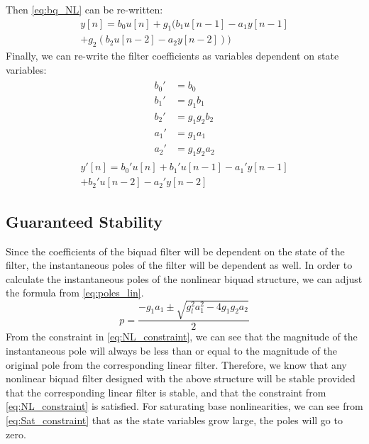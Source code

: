 \documentclass[twoside,a4paper]{article}
\begin{document}
%
Then \cref{eq:bq_NL} can be re-written:
%
\begin{equation}
\begin{split}
    y[n] = b_0 u[n]
         + g_1 (b_1 u[n-1] - a_1 y[n-1] \\
         + g_2 (b_2 u[n-2] - a_2 y[n-2]))
\end{split}
    \label{eq:bq_re-write}
\end{equation}
%
Finally, we can re-write the filter coefficients as variables dependent on
state variables:
%
\begin{align}
\begin{split}
    b_0' &= b_0\\
    b_1' &= g_1 b_1\\
    b_2' &= g_1 g_2 b_2\\
    a_1' &= g_1 a_1\\
    a_2' &= g_1 g_2 a_2
\end{split}
    \label{eq:bq_coefs_re-write}
\end{align}
%
\begin{equation}
\begin{split}
    y'[n] = b_0' u[n]
    + b_1' u[n-1] - a_1' y[n-1] \\
    + b_2' u[n-2] - a_2' y[n-2]
\end{split}
    \label{eq:bq_re-write2}
\end{equation}
%

\subsection{Guaranteed Stability}
%
Since the coefficients of the biquad filter will be dependent on the
state of the filter, the instantaneous poles of the filter will be
dependent as well. In order to calculate the instantaneous poles of
the nonlinear biquad structure, we can adjust the formula from
\cref{eq:poles_lin}.
%
\begin{equation}
    p = \frac{-g_1 a_1 \pm \sqrt{g_l^2 a_1^2- 4 g_1 g_2 a_2}}{2}
    \label{eq:poles_nl}
\end{equation}
%
From the constraint in \cref{eq:NL_constraint}, we can see that the
magnitude of the instantaneous pole will always be less than or equal to
the magnitude of the original pole from the corresponding linear filter.
Therefore, we know that any nonlinear biquad filter designed with the above
structure will be stable provided that the corresponding linear filter is
stable, and that the constraint from \cref{eq:NL_constraint} is satisfied.
\newline\newline
For saturating base nonlinearities, we can see from \cref{eq:Sat_constraint}
that as the state variables grow large, the poles will go to zero.
\end{document}
